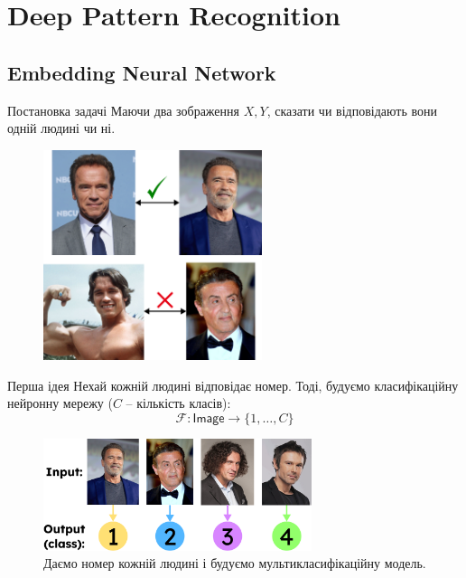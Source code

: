 \documentclass{zkdl-presentation-template}
\begin{document}
    \section{Deep Pattern Recognition}
    \subsection{Embedding Neural Network}
    \begin{frame}{Постановка задачі}
        Маючи два зображення $X,Y$, сказати чи відповідають вони одній людині чи ні.
        \begin{figure}
        \centering
            \includegraphics[width=0.57\textwidth]{images/face_comparison.png}
        \end{figure}
    \end{frame}

    \begin{frame}{Перша ідея}
        Нехай кожній людині відповідає номер. Тоді, будуємо класифікаційну нейронну мережу ($C$ -- кількість класів):
        \begin{equation*}
            \mathcal{F}: \mathsf{Image} \to \{1,\dots,C\}
        \end{equation*}
        \begin{figure}
        \centering
            \includegraphics[width=0.7\textwidth]{images/recognition_classes.png}
            \caption{Даємо номер кожній людині і будуємо мультикласифікаційну модель.}
        \end{figure}
    \end{frame}
\end{document}
